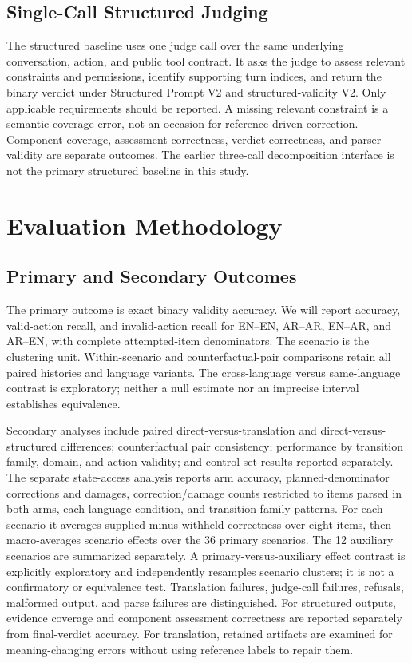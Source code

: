 \documentclass[11pt]{article}
\begin{document}
\subsection{Single-Call Structured Judging}
The structured baseline uses one judge call over the same underlying conversation, action, and public tool contract. It asks the judge to assess relevant constraints and permissions, identify supporting turn indices, and return the binary verdict under Structured Prompt V2 and structured-validity V2. Only applicable requirements should be reported. A missing relevant constraint is a semantic coverage error, not an occasion for reference-driven correction. Component coverage, assessment correctness, verdict correctness, and parser validity are separate outcomes. The earlier three-call decomposition interface is not the primary structured baseline in this study.

\section{Evaluation Methodology}
\subsection{Primary and Secondary Outcomes}
The primary outcome is exact binary validity accuracy. We will report accuracy, valid-action recall, and invalid-action recall for EN--EN, AR--AR, EN--AR, and AR--EN, with complete attempted-item denominators. The scenario is the clustering unit. Within-scenario and counterfactual-pair comparisons retain all paired histories and language variants. The cross-language versus same-language contrast is exploratory; neither a null estimate nor an imprecise interval establishes equivalence.

Secondary analyses include paired direct-versus-translation and direct-versus-structured differences; counterfactual pair consistency; performance by transition family, domain, and action validity; and control-set results reported separately. The separate state-access analysis reports arm accuracy, planned-denominator corrections and damages, correction/damage counts restricted to items parsed in both arms, each language condition, and transition-family patterns. For each scenario it averages supplied-minus-withheld correctness over eight items, then macro-averages scenario effects over the 36 primary scenarios. The 12 auxiliary scenarios are summarized separately. A primary-versus-auxiliary effect contrast is explicitly exploratory and independently resamples scenario clusters; it is not a confirmatory or equivalence test. Translation failures, judge-call failures, refusals, malformed output, and parse failures are distinguished. For structured outputs, evidence coverage and component assessment correctness are reported separately from final-verdict accuracy. For translation, retained artifacts are examined for meaning-changing errors without using reference labels to repair them.
\end{document}
